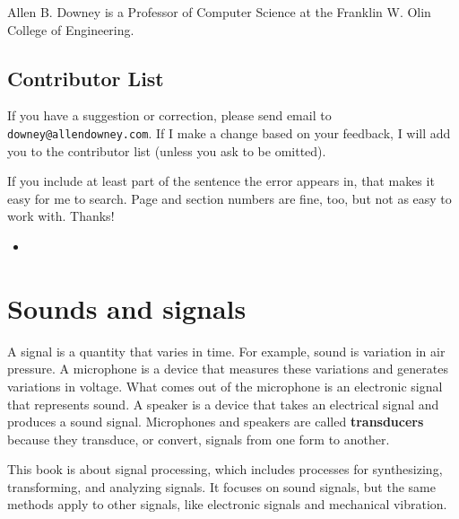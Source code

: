 \documentclass[12pt]{book}
\begin{document}
Allen B. Downey is a Professor of Computer Science at 
the Franklin W. Olin College of Engineering.



\section*{Contributor List}

If you have a suggestion or correction, please send email to 
{\tt downey@allendowney.com}.  If I make a change based on your
feedback, I will add you to the contributor list
(unless you ask to be omitted).

If you include at least part of the sentence the
error appears in, that makes it easy for me to search.  Page and
section numbers are fine, too, but not as easy to work with.
Thanks!

\small

\begin{itemize}

\item 


\end{itemize}

\normalsize

\clearemptydoublepage

\begin{latexonly}

\tableofcontents

\clearemptydoublepage

\end{latexonly}

\mainmatter


\chapter{Sounds and signals}
\label{sounds}

A signal is a quantity that varies in time.  For example, sound is
variation in air pressure.  A microphone is
a device that measures these variations and generates
variations in voltage.  What comes out of the microphone is an
electronic signal that represents sound.
A speaker is a device that takes an electrical signal and produces
a sound signal.  Microphones and speakers are called {\bf transducers}
because they transduce, or convert, signals from one form to another.

This book is about signal processing, which includes processes
for synthesizing, transforming, and analyzing signals.  It focuses
on sound signals, but
the same methods apply to other signals, like electronic signals and
mechanical vibration.
\end{document}
